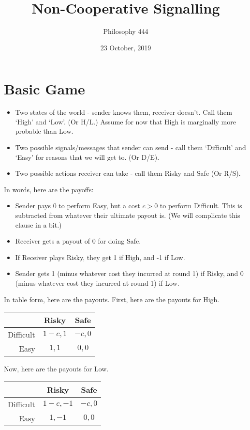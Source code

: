 \documentclass[11pt,]{article}
\title{Non-Cooperative Signalling}
\author{Philosophy 444}
\date{23 October, 2019}
\providecommand{\tightlist}{%
  \setlength{\itemsep}{0pt}\setlength{\parskip}{0pt}}
\begin{document}
\maketitle

\hypertarget{basic-game}{%
\section{Basic Game}\label{basic-game}}

\begin{itemize}
\tightlist
\item
  Two states of the world - sender knows them, receiver doesn't. Call
  them `High' and `Low'. (Or H/L.) Assume for now that High is
  marginally more probable than Low.
\item
  Two possible signals/messages that sender can send - call them
  `Difficult' and `Easy' for reasons that we will get to. (Or D/E).
\item
  Two possible actions receiver can take - call them Risky and Safe (Or
  R/S).
\end{itemize}

In words, here are the payoffs:

\begin{itemize}
\tightlist
\item
  Sender pays 0 to perform Easy, but a cost \(c > 0\) to perform
  Difficult. This is subtracted from whatever their ultimate payout is.
  (We will complicate this clause in a bit.)
\item
  Receiver gets a payout of 0 for doing Safe.
\item
  If Receiver plays Risky, they get 1 if High, and -1 if Low.
\item
  Sender gets 1 (minus whatever cost they incurred at round 1) if Risky,
  and 0 (minus whatever cost they incurred at round 1) if Low.
\end{itemize}

In table form, here are the payouts. First, here are the payouts for
High.

\begin{longtable}[]{@{}rcc@{}}
\toprule
& Risky & Safe\tabularnewline
\midrule
\endhead
Difficult & \(1-c, 1\) & \(-c, 0\)\tabularnewline
Easy & \(1, 1\) & \(0, 0\)\tabularnewline
\bottomrule
\end{longtable}

Now, here are the payouts for Low.

\begin{longtable}[]{@{}rcc@{}}
\toprule
& Risky & Safe\tabularnewline
\midrule
\endhead
Difficult & \(1-c, -1\) & \(-c, 0\)\tabularnewline
Easy & \(1, -1\) & \(0, 0\)\tabularnewline
\bottomrule
\end{longtable}
\end{document}
